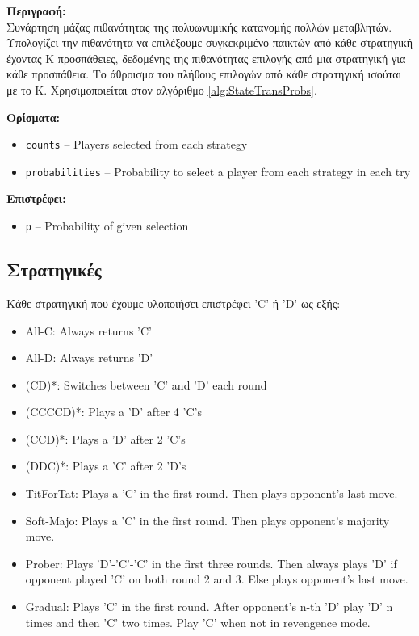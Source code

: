\documentclass[12pt]{report}
\begin{document}
\textbf{\foreignlanguage{greek}{Περιγραφή:}} \\
\foreignlanguage{greek}{Συνάρτηση μάζας πιθανότητας της πολυωνυμικής κατανομής πολλών μεταβλητών. Υπολογίζει την πιθανότητα να επιλέξουμε συγκεκριμένο παικτών από κάθε στρατηγική έχοντας Κ προσπάθειες, δεδομένης της πιθανότητας επιλογής από μια στρατηγική για κάθε προσπάθεια. Το άθροισμα του πλήθους επιλογών από κάθε στρατηγική ισούται με το Κ. Χρησιμοποιείται στον αλγόριθμο \ref{alg:StateTransProbs}.}

\textbf{\foreignlanguage{greek}{Ορίσματα:}}
\begin{itemize}
    \item \texttt{counts} – Players selected from each strategy
    \item \texttt{probabilities} – Probability to select a player from each strategy in each try
\end{itemize}
\textbf{\foreignlanguage{greek}{Επιστρέφει}:}
\begin{itemize}
    \item \texttt{p} – Probability of given selection
\end{itemize}


\subsection*{\foreignlanguage{greek}{Στρατηγικές}}
\foreignlanguage{greek}{
Κάθε στρατηγική που έχουμε υλοποιήσει επιστρέφει \foreignlanguage{english}{'C'} ή \foreignlanguage{english}{'D'} ως εξής:}
\begin{itemize}
\item All-C: Always returns 'C'
\item All-D: Always returns 'D'
\item (CD)*: Switches between 'C' and 'D' each round
\item (CCCCD)*: Plays a 'D' after 4 'C's
\item (CCD)*: Plays a 'D' after 2 'C's
\item (DDC)*: Plays a 'C' after 2 'D's
\item TitForTat: Plays a 'C' in the first round. Then plays opponent's last move.
\item Soft-Majo: Plays a 'C' in the first round. Then plays opponent's majority move.
\item Prober: Plays 'D'-'C'-'C' in the first three rounds. Then always plays 'D' if opponent played 'C' on both round 2 and 3. Else plays opponent's last move.
\item Gradual: Plays 'C' in the first round. After opponent's n-th 'D' play 'D' n times and then 'C' two times. Play 'C' when not in revengence mode.
\end{itemize}
\end{document}
